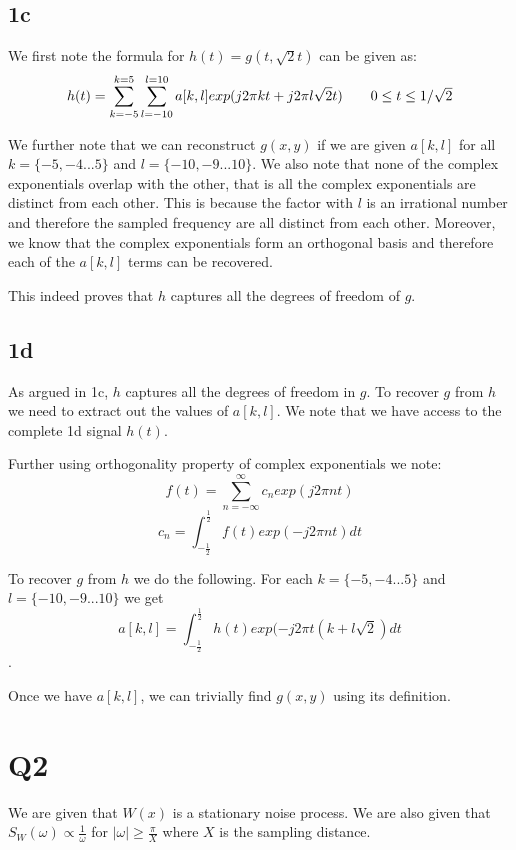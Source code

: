 \documentclass{article}
\begin{document}
\subsection*{1c}

We first note the formula for $h(t) = g(t, \sqrt{2}t)$ can be given as:
\begin{align}
  \label{eq:2}
  h(t) = \sum_{k=-5}^{k=5}\sum_{l=-10}^{l=10}a[k, l] exp(j2\pi kt + j2\pi l\sqrt{2}t) \tag*{$0 \le t \le 1 / \sqrt{2}$}
\end{align}

We further note that we can reconstruct $g(x, y)$ if we are given $a[k, l]$ for all $k = \{-5, -4 ... 5\}$ and $l = \{-10, -9 ... 10\}$. We also note that none of the complex exponentials overlap with the other, that is all the complex exponentials are distinct from each other. This is because the factor with $l$ is an irrational number and therefore the sampled frequency are all distinct from each other. Moreover, we know that the complex exponentials form an orthogonal basis and therefore each of the $a[k, l]$ terms can be recovered.

This indeed proves that $h$ captures all the degrees of freedom of $g$.

\subsection*{1d}
As argued in 1c, $h$ captures all the degrees of freedom in $g$. To recover $g$ from $h$ we need to extract out the values of $a[k, l]$. We note that we have access to the complete 1d signal $h(t)$.

Further using orthogonality property of complex exponentials we note:
$$f(t) = \sum_{n=-\infty}^{\infty} c_n exp(j2\pi n t)$$
$$c_n = \int_{-\frac{1}{2}}^{\frac{1}{2}} f(t)exp(-j 2\pi n t)dt$$

To recover $g$ from $h$ we do the following. For each $k = \{-5, -4 ... 5\}$ and $l = \{-10, -9 ... 10\}$ we get
$$a[k, l] = \int_{-\frac{1}{2}}^{\frac{1}{2}} h(t) exp(-j 2\pi t (k + l \sqrt{2}) dt$$.

Once we have $a[k, l]$, we can trivially find $g(x,y)$ using its definition.


\section*{Q2}
We are given that $W(x)$ is a stationary noise process. We are also given that $S_W(\omega) \propto \frac{1}{\omega}$ for $|\omega| \ge \frac{\pi}{X}$ where $X$ is the sampling distance.
\end{document}
